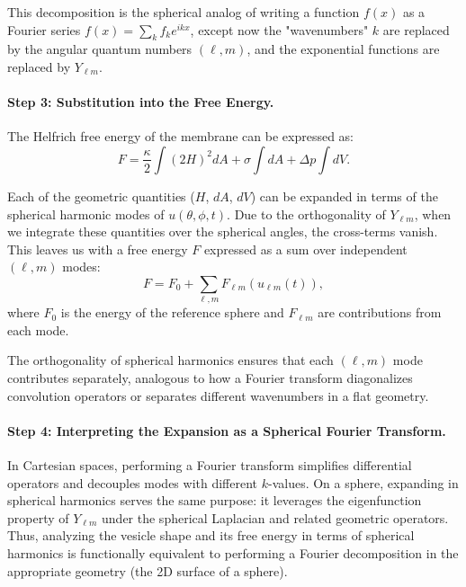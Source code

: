 \documentclass[12pt,a4paper]{article}
\begin{document}
This decomposition is the spherical analog of writing a function $f(x)$ as a Fourier series $f(x)=\sum_k f_k e^{ikx}$, except now the "wavenumbers" $k$ are replaced by the angular quantum numbers $(\ell,m)$, and the exponential functions are replaced by $Y_{\ell m}$.

\paragraph{Step 3: Substitution into the Free Energy.}

The Helfrich free energy of the membrane can be expressed as:
\begin{equation}
F = \frac{\kappa}{2} \int (2H)^2 dA + \sigma \int dA + \Delta p \int dV.
\end{equation}

Each of the geometric quantities ($H$, $dA$, $dV$) can be expanded in terms of the spherical harmonic modes of $u(\theta,\phi,t)$. Due to the orthogonality of $Y_{\ell m}$, when we integrate these quantities over the spherical angles, the cross-terms vanish. This leaves us with a free energy $F$ expressed as a sum over independent $(\ell,m)$ modes:
\begin{equation}
F = F_0 + \sum_{\ell,m} F_{\ell m}(u_{\ell m}(t)),
\end{equation}
where $F_0$ is the energy of the reference sphere and $F_{\ell m}$ are contributions from each mode.

The orthogonality of spherical harmonics ensures that each $(\ell,m)$ mode contributes separately, analogous to how a Fourier transform diagonalizes convolution operators or separates different wavenumbers in a flat geometry.

\paragraph{Step 4: Interpreting the Expansion as a Spherical Fourier Transform.}

In Cartesian spaces, performing a Fourier transform simplifies differential operators and decouples modes with different $k$-values. On a sphere, expanding in spherical harmonics serves the same purpose: it leverages the eigenfunction property of $Y_{\ell m}$ under the spherical Laplacian and related geometric operators. Thus, analyzing the vesicle shape and its free energy in terms of spherical harmonics is functionally equivalent to performing a Fourier decomposition in the appropriate geometry (the 2D surface of a sphere).
\end{document}
